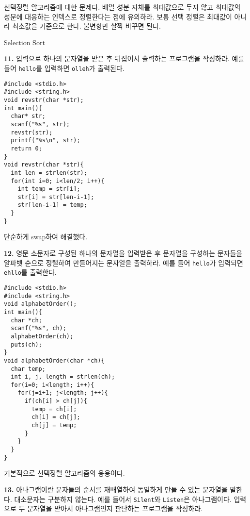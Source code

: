 \documentclass[a4paper,chapter,atbegshi]{oblivoir}
\begin{document}
선택정렬 알고리즘에 대한 문제다. 배열 성분 자체를 최대값으로 두지 않고
최대값의 성분에 대응하는 인덱스로 정렬한다는 점에 유의하라. 보통 선택
정렬은 최대값이 아니라 최소값을 기준으로 한다. 불변항만 살짝 바꾸면 된다.
\begin{algorithm}
  \caption{Selection Sort}
\end{algorithm}
\begin{mdframed}\textbf{11. }
  입력으로 하나의 문자열을 받은 후 뒤집어서 출력하는 프로그램을 작성하라. 예를
  들어 \texttt{hello}를 입력하면 \texttt{olleh}가 출력된다.
\end{mdframed}
\begin{lstlisting}[style=C]
#include <stdio.h>
#include <string.h>
void revstr(char *str);
int main(){
  char* str;
  scanf("%s", str);
  revstr(str);
  printf("%s\n", str);
  return 0;
}
void revstr(char *str){
  int len = strlen(str);
  for(int i=0; i<len/2; i++){
    int temp = str[i];
    str[i] = str[len-i-1];
    str[len-i-1] = temp;
  }
}
\end{lstlisting}
단순하게 swap하여 해결했다.
\hfill\break
\begin{mdframed}\textbf{12. }
  영문 소문자로 구성된 하나의 문자열을 입력받은 후 문자열을 구성하는 문자들을
  알파벳 순으로 정렬하여 만들어지는 문자열을 출력하라. 예를 들어 \texttt{hello}가
  입력되면 \texttt{ehllo}를 출력한다.
\end{mdframed}
\begin{lstlisting}[style=C]
#include <stdio.h>
#include <string.h>
void alphabetOrder();
int main(){
  char *ch;
  scanf("%s", ch);
  alphabetOrder(ch);
  puts(ch);
}
void alphabetOrder(char *ch){
  char temp;
  int i, j, length = strlen(ch);
  for(i=0; i<length; i++){
    for(j=i+1; j<length; j++){
      if(ch[i] > ch[j]){
        temp = ch[i];
        ch[i] = ch[j];
        ch[j] = temp;
      }
    }
  }
}
\end{lstlisting}
기본적으로 선택정렬 알고리즘의 응용이다.
\hfill\break
\begin{mdframed}\textbf{13. }
  아나그램이란 문자들의 순서를 재배열하여 동일하게 만들 수 있는 문자열을
  말한다. 대소문자는 구분하지 않는다. 예를 들어서 \texttt{Silent}와
  \texttt{Listen}은 아나그램이다. 입력으로 두 문자열을 받아서 아나그램인지
  판단하는 프로그램을 작성하라.
\end{mdframed}
\end{document}
